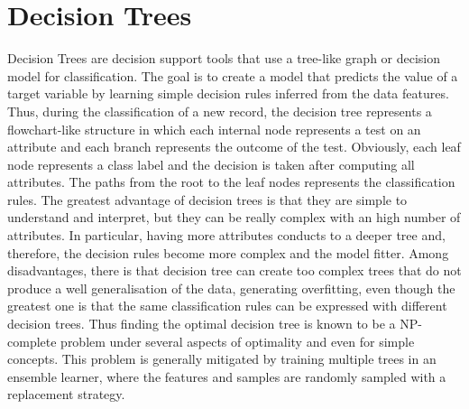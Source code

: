 \documentclass[final,a4paper,12pt,english]{UnicaPhdThesis3}
\begin{document}
\section{Decision Trees} \label{DT}
Decision Trees \cite{Quinlan} are decision support tools that use a tree-like graph or decision model for classification. The goal is to create a model that predicts the value of a target variable by learning simple decision rules inferred from the data features. Thus, during the classification of a new record, the decision tree represents a flowchart-like structure in which each internal node represents a test on an attribute and each branch represents the outcome of the test. Obviously, each leaf node represents a class label and the decision is taken after computing all attributes. The paths from the root to the leaf nodes represents the classification rules. The greatest advantage of decision trees is that they are simple to understand and interpret, but they can be really complex with an high number of attributes. In particular, having more attributes conducts to a deeper tree and, therefore, the decision rules become more complex and the model fitter.
Among disadvantages, there is that decision tree can create too complex trees that do not produce a well generalisation of the data, generating overfitting, even though the greatest one is that the same classification rules can be expressed with different decision trees. Thus finding the optimal decision tree is known to be a NP-complete problem under several aspects of optimality and even for simple concepts. This problem is generally mitigated by training multiple trees in an ensemble learner, where the features and samples are randomly sampled with a replacement strategy.
\end{document}
